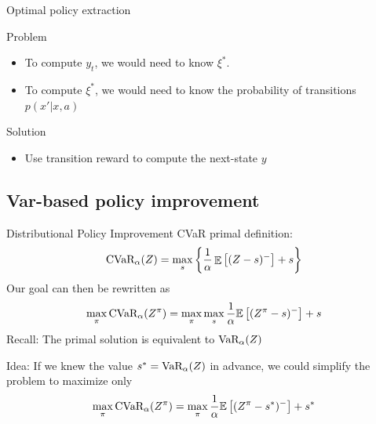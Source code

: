 \documentclass{beamer}
\begin{document}
\begin{frame}{Optimal policy extraction}


\begin{alertblock}{Problem}
\begin{itemize}
\item To compute $y_t$, we would need to know $\xi^*$.
\item To compute $\xi^*$, we would need to know the probability of transitions $p(x'|x, a)$
\end{itemize}
\end{alertblock}

\bigskip
\begin{exampleblock}{Solution}
\begin{itemize}
\item Use transition reward to compute the next-state $y$
\end{itemize}
\end{exampleblock}
\end{frame}

\subsection{Var-based policy improvement}

\begin{frame}{Distributional Policy Improvement}
CVaR primal definition:
\begin{equation*}
\text{CVaR}_\alpha(Z)=\max_s\left\lbrace \dfrac{1}{\alpha}\mathop{\mathbb{E}}\left[ (Z-s)^-\right] + s  \right\rbrace 
\end{equation*}
Our goal can then be rewritten as
\begin{equation*}
\max_\pi \text{CVaR}_\alpha(Z^\pi) = \max_\pi \max_s \dfrac{1}{\alpha}\mathbb{E}
\left[ (Z^\pi-s)^-\right] + s
\end{equation*}
Recall: The primal solution is equivalent to $\text{VaR}_\alpha(Z)$

Idea: If we knew the value $s^*=\text{VaR}_\alpha(Z)$ in advance, we could simplify the problem to maximize only
\begin{equation}
\max_\pi \text{CVaR}_\alpha(Z^\pi) = \max_\pi \dfrac{1}{\alpha}\mathbb{E}\left[ (Z^\pi-s^*)^-\right] + s^*
\end{equation}
\end{frame}
\end{document}

